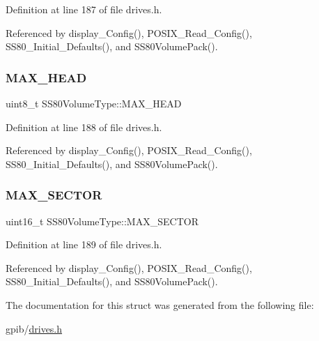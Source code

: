 Definition at line 187 of file drives.\+h.



Referenced by display\+\_\+\+Config(), P\+O\+S\+I\+X\+\_\+\+Read\+\_\+\+Config(), S\+S80\+\_\+\+Initial\+\_\+\+Defaults(), and S\+S80\+Volume\+Pack().

\mbox{\label{structSS80VolumeType_acc2870eb0a52a0e7f4dc57f036d903b1}} 
\subsubsection{\texorpdfstring{M\+A\+X\+\_\+\+H\+E\+AD}{MAX\_HEAD}}
{\footnotesize\ttfamily uint8\+\_\+t S\+S80\+Volume\+Type\+::\+M\+A\+X\+\_\+\+H\+E\+AD}



Definition at line 188 of file drives.\+h.



Referenced by display\+\_\+\+Config(), P\+O\+S\+I\+X\+\_\+\+Read\+\_\+\+Config(), S\+S80\+\_\+\+Initial\+\_\+\+Defaults(), and S\+S80\+Volume\+Pack().

\mbox{\label{structSS80VolumeType_a0a367b3bf05801cdee9dadc8324a3bdb}} 
\subsubsection{\texorpdfstring{M\+A\+X\+\_\+\+S\+E\+C\+T\+OR}{MAX\_SECTOR}}
{\footnotesize\ttfamily uint16\+\_\+t S\+S80\+Volume\+Type\+::\+M\+A\+X\+\_\+\+S\+E\+C\+T\+OR}



Definition at line 189 of file drives.\+h.



Referenced by display\+\_\+\+Config(), P\+O\+S\+I\+X\+\_\+\+Read\+\_\+\+Config(), S\+S80\+\_\+\+Initial\+\_\+\+Defaults(), and S\+S80\+Volume\+Pack().



The documentation for this struct was generated from the following file\+:\begin{DoxyCompactItemize}
\item 
gpib/\hyperlink{drives_8h}{drives.\+h}\end{DoxyCompactItemize}
